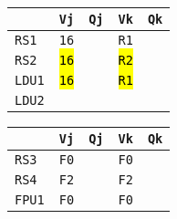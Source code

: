 \begin{enumerate}
    \begin{minipage}{0.45\textwidth}
        \centering
        \begin{tabular}{@{} l | l l l l @{}}
            \toprule
                & \texttt{Vj} & \texttt{Qj} & \texttt{Vk} & \texttt{Qk} \\
            \midrule
            \texttt{RS1} & \texttt{16} & & \texttt{R1} & \\ [.3em]
            \texttt{RS2} & \hl{\texttt{16}} & & \hl{\texttt{R2}} & \\
            \cmidrule{1-5}
            \texttt{LDU1} & \hl{\texttt{16}} & & \hl{\texttt{R1}} & \\ [.3em]
            \texttt{LDU2} & & & & \\
            \bottomrule
        \end{tabular}
    \end{minipage}
    \hfill
    \begin{minipage}{0.45\textwidth}
        \centering
        \begin{tabular}{@{} l | l l l l @{}}
            \toprule
            & \texttt{Vj} & \texttt{Qj} & \texttt{Vk} & \texttt{Qk} \\
            \midrule
            \texttt{RS3} & \texttt{F0} & & \texttt{F0} & \\ [.3em]
            \texttt{RS4} & \texttt{F2} & & \texttt{F2} & \\
            \cmidrule{1-5}
            \texttt{FPU1} & \texttt{F0} & & \texttt{F0} & \\
            \bottomrule
        \end{tabular}
    \end{minipage}


\end{enumerate}
